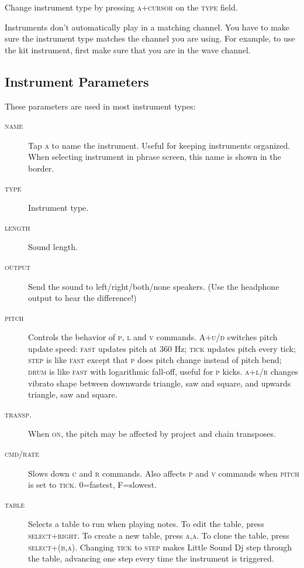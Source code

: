 Change instrument type by pressing \textsc{a+cursor} on the \textsc{type} field.

Instruments don't automatically play in a matching channel. You have to make sure the instrument type matches the channel you are using. For example, to use the kit instrument, first make sure that you are in the wave channel.

\subsection{Instrument Parameters}
\label{general-instrument-parameters}

These parameters are used in most instrument types:

\begin{description}
	\item[\textsc{name}] Tap \textsc{a} to name the instrument. Useful for keeping instruments organized. When selecting instrument in phrase screen, this name is shown in the border.
	\item[\textsc{type}] Instrument type.
	\item[\textsc{length}] Sound length.
	\item[\textsc{output}] Send the sound to left/right/both/none speakers. (Use the headphone output to hear the difference!)
    \item[\textsc{pitch}] Controls the behavior of \textsc{p}, \textsc{l} and \textsc{v} commands. \textsc{A+u/d} switches pitch update speed: \textsc{fast} updates pitch at 360 Hz; \textsc{tick} updates pitch every tick; \textsc{step} is like \textsc{fast} except that \textsc{p} does pitch change instead of pitch bend; \textsc{drum} is like \textsc{fast} with logarithmic fall-off, useful for \textsc{p} kicks. \textsc{a+l/r} changes vibrato shape between downwards triangle, saw and square, and upwards triangle, saw and square.
    \item[\textsc{transp.}] When \textsc{on}, the pitch may be affected by project and chain transposes.
    \item[\textsc{cmd/rate}] Slows down \textsc{c} and \textsc{r} commands.
        Also affects \textsc{p} and \textsc{v} commands when \textsc{pitch} is set to \textsc{tick}.
        0=fastest, F=slowest.
    \item[\textsc{table}] Selects a table to run when playing notes. To edit the table, press \textsc{select+right}. To create a new table, press \textsc{a,a}. To clone the table, press \textsc{select+(b,a)}.
        Changing \textsc{tick} to \textsc{step} makes Little Sound Dj step through the table, advancing one step every time the instrument is triggered.
\end{description}

